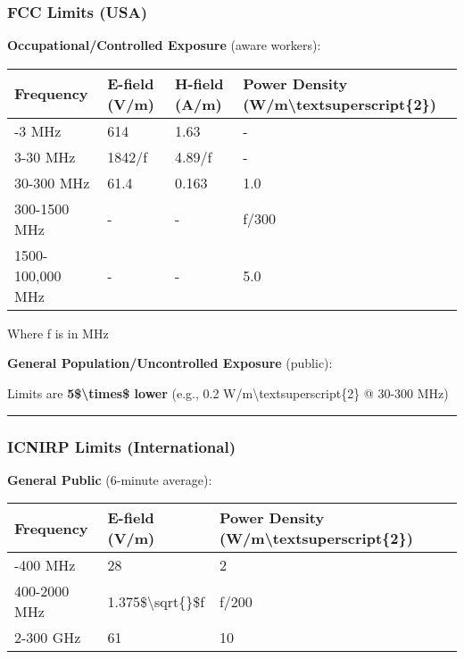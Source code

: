 \subsubsection{FCC Limits (USA)}\label{fcc-limits-usa}

\textbf{Occupational/Controlled Exposure} (aware workers):

{\def\LTcaptype{} %
\begin{longtable}[]{@{}llll@{}}
\toprule\noalign{}
Frequency & E-field (V/m) & H-field (A/m) & Power Density
(W/m\textbackslash textsuperscript\{2\}) \\
\midrule\noalign{}
\endhead
\bottomrule\noalign{}
\endlastfoot
0.3-3 MHz & 614 & 1.63 & - \\
3-30 MHz & 1842/f & 4.89/f & - \\
30-300 MHz & 61.4 & 0.163 & 1.0 \\
300-1500 MHz & - & - & f/300 \\
1500-100,000 MHz & - & - & 5.0 \\
\end{longtable}
}

Where f is in MHz

\textbf{General Population/Uncontrolled Exposure} (public):

Limits are \textbf{5\$\textbackslash times\$ lower} (e.g., 0.2
W/m\textbackslash textsuperscript\{2\} @ 30-300 MHz)

\begin{center}\rule{0.5\linewidth}{0.5pt}\end{center}

\subsubsection{ICNIRP Limits
(International)}\label{icnirp-limits-international}

\textbf{General Public} (6-minute average):

{\def\LTcaptype{} %
\begin{longtable}[]{@{}lll@{}}
\toprule\noalign{}
Frequency & E-field (V/m) & Power Density
(W/m\textbackslash textsuperscript\{2\}) \\
\midrule\noalign{}
\endhead
\bottomrule\noalign{}
\endlastfoot
10-400 MHz & 28 & 2 \\
400-2000 MHz & 1.375\$\textbackslash sqrt\{\}\$f & f/200 \\
2-300 GHz & 61 & 10 \\
\end{longtable}
}


